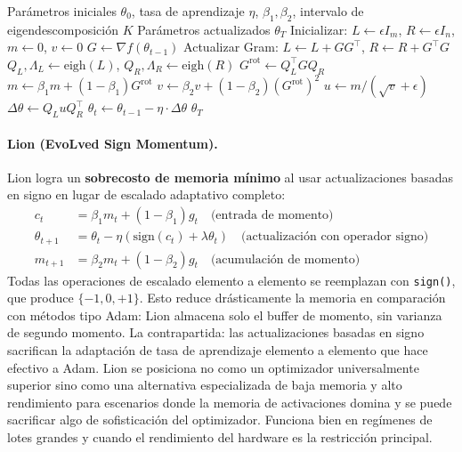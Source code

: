 \begin{algorithm}[H]
\caption{SOAP (Shampoo with Adam in Eigenbasis)}
\label{alg:soap}
\begin{algorithmic}[1]
\Require Parámetros iniciales $\theta_0$, tasa de aprendizaje $\eta$, $\beta_1, \beta_2$, intervalo de eigendescomposición $K$
\Ensure Parámetros actualizados $\theta_T$
\State Inicializar: $L \gets \epsilon I_m$, $R \gets \epsilon I_n$, $m \gets 0$, $v \gets 0$
    \State $G \gets \nabla f(\theta_{t-1})$ 
    \State Actualizar Gram: $L \gets L + G G^\top$, $R \gets R + G^\top G$
        \State $Q_L, \Lambda_L \gets \text{eigh}(L)$, $Q_R, \Lambda_R \gets \text{eigh}(R)$
    \EndIf
    \State $G^{\text{rot}} \gets Q_L^\top G Q_R$ 
    \State $m \gets \beta_1 m + (1-\beta_1) G^{\text{rot}}$ 
    \State $v \gets \beta_2 v + (1-\beta_2) (G^{\text{rot}})^2$ 
    \State $u \gets m / (\sqrt{v} + \epsilon)$ 
    \State $\Delta \theta \gets Q_L u Q_R^\top$ 
    \State $\theta_t \gets \theta_{t-1} - \eta \cdot \Delta \theta$
\EndFor
\Return $\theta_T$
\end{algorithmic}
\end{algorithm}

\paragraph{Lion (EvoLved Sign Momentum).}
Lion logra un \textbf{sobrecosto de memoria mínimo} al usar actualizaciones basadas en signo en lugar de escalado adaptativo completo:\begin{align}
c_t &= \beta_1 m_t + (1-\beta_1) g_t \quad\text{(entrada de momento)} \\
\theta_{t+1} &= \theta_t - \eta \left(\text{sign}(c_t) + \lambda\theta_t\right) \quad\text{(actualización con operador signo)} \\
m_{t+1} &= \beta_2 m_t + (1-\beta_2) g_t \quad\text{(acumulación de momento)}
\end{align}
Todas las operaciones de escalado elemento a elemento se reemplazan con \texttt{sign()}, que produce $\{-1, 0, +1\}$. Esto reduce drásticamente la memoria en comparación con métodos tipo Adam: Lion almacena solo el buffer de momento, sin varianza de segundo momento. La contrapartida: las actualizaciones basadas en signo sacrifican la adaptación de tasa de aprendizaje elemento a elemento que hace efectivo a Adam. Lion se posiciona no como un optimizador universalmente superior sino como una alternativa especializada de baja memoria y alto rendimiento para escenarios donde la memoria de activaciones domina y se puede sacrificar algo de sofisticación del optimizador. Funciona bien en regímenes de lotes grandes y cuando el rendimiento del hardware es la restricción principal.

